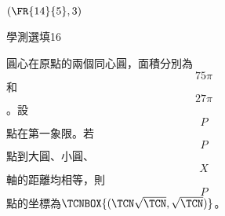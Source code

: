 \begin{QUESTIONS}
\begin{QUESTION}
\begin{QANS}
            $(\FR{14}{5}, 3)$
        \end{QANS}
        \begin{QSOLLIST}
        \end{QSOLLIST}
        \begin{QEMPTYSPACE}
        \end{QEMPTYSPACE}
    \end{QUESTION}
    \begin{QUESTION}
        \begin{ExamInfo}{85}{學測}{選填}{16}
        \end{ExamInfo}
        \begin{ExamAnsRateInfo}{}{}{}{}
        \end{ExamAnsRateInfo}
        \begin{QBODY}
             
           圓心在原點的兩個同心圓，面積分別為\[75\pi \]和\[27\pi \]。設\[P\]點在第一象限。若\[P\]點到大圓、小圓、\[X\]軸的距離均相等，則\[P\]點的坐標為$\TCNBOX{(\TCN\sqrt{\TCN}, \sqrt{\TCN})}$。
            

\end{QBODY}
\end{QUESTION}
\end{QUESTIONS}
